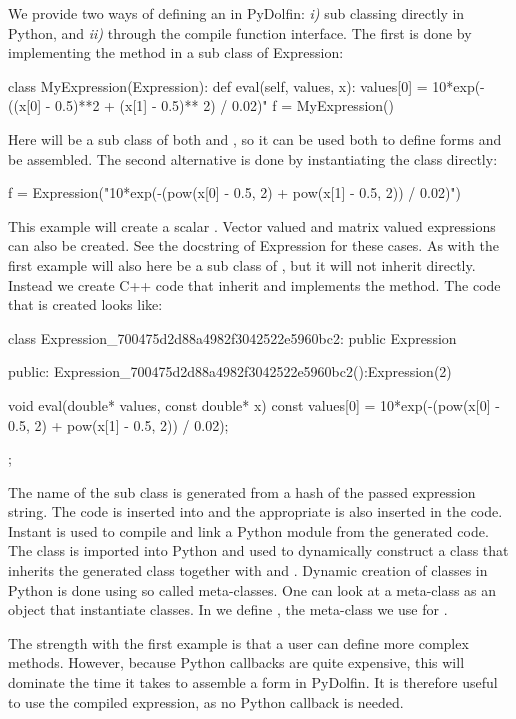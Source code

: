 We provide two ways of defining an  in PyDolfin: \textit{i)} sub classing  directly in Python, and \textit{ii)} through the compile function interface. The first is done by implementing the  method in a sub class of Expression:
\begin{python}
class MyExpression(Expression):
    def eval(self, values, x):
        values[0] = 10*exp(-((x[0] - 0.5)**2 + (x[1] - 0.5)** 2) / 0.02)"
f = MyExpression()
\end{python}
Here will  be a sub class of both  and , so it can be used both to define \ufl forms and be assembled. The second alternative is done by instantiating the  class directly:
\begin{c++}
f = Expression("10*exp(-(pow(x[0] - 0.5, 2) + pow(x[1] - 0.5, 2)) / 0.02)")
\end{c++}
This example will create a scalar . Vector valued and matrix valued expressions can also be created. See the docstring of Expression for these cases. As with the first example will  also here be a sub class of , but it will not inherit  directly. Instead we create C++ code that inherit  and implements the  method. The code that is created looks like:
\begin{c++}
class Expression_700475d2d88a4982f3042522e5960bc2: public Expression{
public:
  Expression_700475d2d88a4982f3042522e5960bc2():Expression(2){}

  void eval(double* values, const double* x) const{
    values[0] = 10*exp(-(pow(x[0] - 0.5, 2) + pow(x[1] - 0.5, 2)) / 0.02);
  }
};
\end{c++}
The name of the sub class is generated from a hash of the passed expression string. The code is inserted into  and the appropriate  is also inserted in the code. Instant is used to compile and link a Python module from the generated code. The class is imported into Python and used to dynamically construct a class that inherits the generated class together with  and . Dynamic creation of classes in Python is done using so called meta-classes. One can look at a meta-class as an object that instantiate classes. In  we define , the meta-class we use for .\par

The strength with the first example is that a user can define more complex  methods. However, because Python callbacks are quite expensive, this will dominate the time it takes to assemble a form in PyDolfin. It is therefore useful to use the compiled expression, as no Python callback is needed.\par

